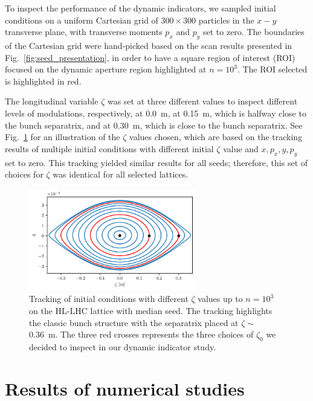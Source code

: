 To inspect the performance of the dynamic indicators, we sampled initial conditions on a uniform Cartesian grid of $300\times300$ particles in the $x-y$ transverse plane, with transverse moments $p_x$ and $p_y$ set to zero. The boundaries of the Cartesian grid were hand-picked based on the scan results presented in Fig.~\ref{fig:seed_presentation}, in order to have a square region of interest (ROI) focused on the dynamic aperture region highlighted at $n=10^3$. The ROI selected is highlighted in red.

The longitudinal variable $\zeta$ was set at three different values to inspect different levels of modulations, respectively, at \SI{0.0}{\meter}, at \SI{0.15}{\meter}, which is halfway close to the bunch separatrix, and at \SI{0.30}{\meter}, which is close to the bunch separatrix. See Fig.~\ref{fig:the_bunch} for an illustration of the $\zeta$ values chosen, which are based on the tracking results of multiple initial conditions with different initial $\zeta$ value and $x, p_x, y, p_y$ set to zero. This tracking yielded similar results for all seeds; therefore, this set of choices for $\zeta$ was identical for all selected lattices.

\begin{figure}
    \centering
    \includegraphics[width=0.65\textwidth]{6_lhc_dynamic_indicators/figs/longitudinal.pdf}
    \caption{Tracking of initial conditions with different $\zeta$ values up to $n=10^3$ on the HL-LHC lattice with median seed. The tracking highlights the classic bunch structure with the separatrix placed at $\zeta \sim$ \SI{0.36}{\meter}. The three red crosses represents the three choices of $\zeta_0$ we decided to inspect in our dynamic indicator study.}
    \label{fig:the_bunch}
\end{figure}

\section{Results of numerical studies} \label{sec:results}

